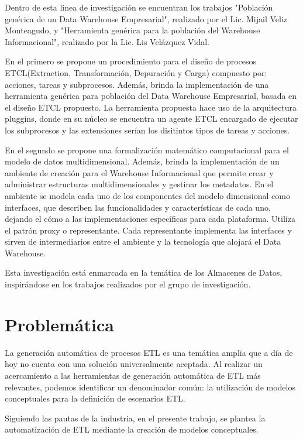 Dentro de esta l\'inea de investigación se encuentran los trabajos "Población genérica de un Data Warehouse Empresarial", 
realizado por el Lic. Mijail Veliz Monteagudo, y "Herramienta genérica para la población del Warehouse Informacional", 
realizado por la Lic. Lis Velázquez Vidal.

En el primero se propone un procedimiento para el diseño de procesos ETCL(Extraction, Transformaci\'on, Depuraci\'on y Carga) 
compuesto por: acciones, tareas y subprocesos.
Además, brinda la implementación de una herramienta genérica para población del Data Warehouse Empresarial, basada en el 
diseño ETCL propuesto. La herramienta propuesta hace uso de la arquitectura pluggins\cite{noauthor_plug-architectures_nodate}, 
donde en su n\'ucleo se encuentra 
un agente ETCL encargado de ejecutar los subprocesos y las extensiones ser\'ian los disitintos tipos de tareas y acciones.

En el segundo se propone una formalización matemático computacional para el modelo de datos multidimensional. Además,
brinda la implementación de un ambiente de creación para el Warehouse Informacional que permite crear y administrar 
estructuras multidimensionales y gestinar los metadatos. En el ambiente se modela cada uno de los componentes del modelo 
dimensional como interfaces, que describen las funcionalidades y caracter\'isticas de cada uno, dejando el c\'omo a las 
implementaciones 
espec\'ificas para cada plataforma. Utiliza el patr\'on proxy o representante. Cada representante implementa 
las interfaces y sirven de intermediarios entre el ambiente y la tecnología que alojar\'a el Data Warehouse.

Esta investigaci\'on est\'a enmarcada en la tem\'atica de los Almacenes de Datos, inspir\'andose en los trabajos 
realizados por el grupo de investigación.


\section{Problem\'atica}

La generaci\'on autom\'atica de procesos ETL es una tem\'atica amplia que a d\'ia de hoy no cuenta con una soluci\'on 
universalmente aceptada. Al realizar un acercamiento a las herramientas de generación automática de ETL más relevantes, podemos 
identificar un denominador común: la utilización de modelos conceptuales para la definición de escenarios ETL.

Siguiendo las pautas de la industria, en el presente trabajo, se plantea la automatización de ETL mediante 
la creaci\'on de modelos conceptuales.

